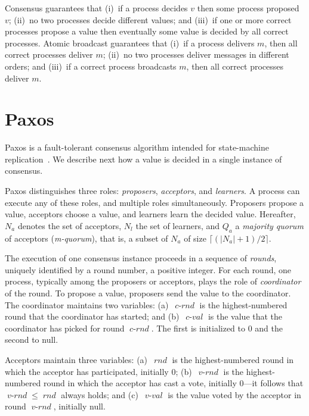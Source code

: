 \documentclass[final,3p,times,twocolumn,authoryear]{elsarticle}
\newcommand{\mv}[1]{\ensuremath{\operatorname{\mathit{#1}}}}
\begin{document}
Consensus guarantees that (i)~if a process decides $v$ then some process proposed $v$; (ii)~no two processes decide different values; and (iii)~if one or more correct processes propose a value then eventually some value is decided by all correct processes.
Atomic broadcast guarantees that (i)~if a process delivers $m$, then all correct processes deliver $m$; (ii)~no two processes deliver  messages in different orders; and (iii)~if a correct process broadcasts $m$, then all correct processes deliver $m$.



\section{Paxos}
\label{sec:paxos}

Paxos is a fault-tolerant consensus algorithm intended for state-machine replication~\cite{Lam98}.
We describe next how a value is decided in a single instance of consensus.

Paxos distinguishes three roles: \emph{proposers}, \emph{acceptors}, and \emph{learners}. A process can execute any of these roles, and multiple roles simultaneously. Proposers propose a value, acceptors choose a value, and learners learn the decided value. Hereafter, $N_a$ denotes the set of acceptors, $N_l$ the set of learners, and $Q_a$ a \emph{majority quorum} of acceptors (\emph{m-quorum}), that is, a subset of $N_a$ of size $\lceil (|N_a|+1)/2 \rceil$.

The execution of one consensus instance proceeds in a sequence of \emph{rounds}, uniquely identified by a round number, a positive integer. For each round, one process, typically among the proposers or acceptors, plays the role of \emph{coordinator} of the round. To propose a value, proposers send the value to the coordinator.
The coordinator maintains two variables: (a)~\mv{c-rnd} is the highest-numbered round that the coordinator has started; and (b)~\mv{c-val} is the value that the coordinator has picked for round \mv{c-rnd}. The first is initialized to 0 and the second to null.

Acceptors maintain three variables: (a)~\mv{rnd} is the highest-numbered round in which the acceptor has participated, initially 0; (b)~\mv{v-rnd} is the highest-numbered round in which the acceptor has cast a vote, initially 0---it follows that $\mv{v-rnd} \leq \mv{rnd}$ always holds; and (c)~\mv{v-val} is the value voted by the acceptor in round \mv{v-rnd}, initially null.
\end{document}
